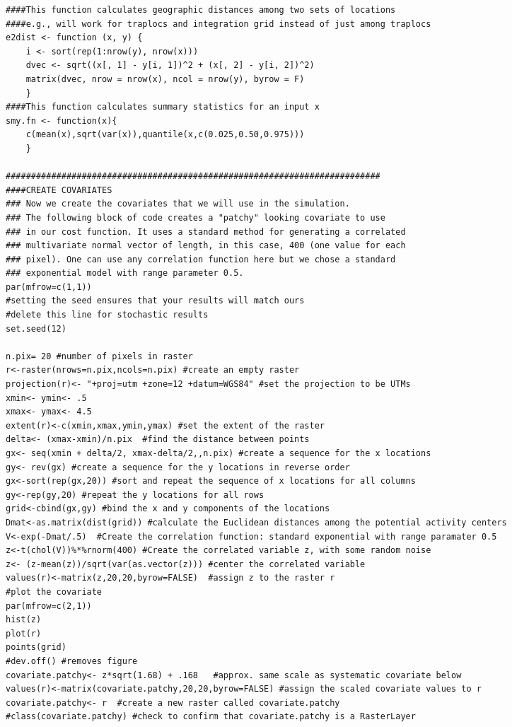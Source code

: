 \documentclass[12pt]{article}
\begin{document}
\begin{spacing}{1.2}
{\begin{verbatim}
####This function calculates geographic distances among two sets of locations 
####e.g., will work for traplocs and integration grid instead of just among traplocs 
e2dist <- function (x, y) {
    i <- sort(rep(1:nrow(y), nrow(x)))
    dvec <- sqrt((x[, 1] - y[i, 1])^2 + (x[, 2] - y[i, 2])^2)
    matrix(dvec, nrow = nrow(x), ncol = nrow(y), byrow = F)
    }
####This function calculates summary statistics for an input x
smy.fn <- function(x){
    c(mean(x),sqrt(var(x)),quantile(x,c(0.025,0.50,0.975)))
    }

##########################################################################
####CREATE COVARIATES
### Now we create the covariates that we will use in the simulation.
### The following block of code creates a "patchy" looking covariate to use
### in our cost function. It uses a standard method for generating a correlated
### multivariate normal vector of length, in this case, 400 (one value for each
### pixel). One can use any correlation function here but we chose a standard
### exponential model with range parameter 0.5.
par(mfrow=c(1,1))
#setting the seed ensures that your results will match ours 
#delete this line for stochastic results
set.seed(12)  

n.pix= 20 #number of pixels in raster
r<-raster(nrows=n.pix,ncols=n.pix) #create an empty raster
projection(r)<- "+proj=utm +zone=12 +datum=WGS84" #set the projection to be UTMs
xmin<- ymin<- .5
xmax<- ymax<- 4.5
extent(r)<-c(xmin,xmax,ymin,ymax) #set the extent of the raster
delta<- (xmax-xmin)/n.pix  #find the distance between points 
gx<- seq(xmin + delta/2, xmax-delta/2,,n.pix) #create a sequence for the x locations
gy<- rev(gx) #create a sequence for the y locations in reverse order
gx<-sort(rep(gx,20)) #sort and repeat the sequence of x locations for all columns
gy<-rep(gy,20) #repeat the y locations for all rows
grid<-cbind(gx,gy) #bind the x and y components of the locations
Dmat<-as.matrix(dist(grid)) #calculate the Euclidean distances among the potential activity centers 
V<-exp(-Dmat/.5)  #Create the correlation function: standard exponential with range paramater 0.5
z<-t(chol(V))%*%rnorm(400) #Create the correlated variable z, with some random noise
z<- (z-mean(z))/sqrt(var(as.vector(z))) #center the correlated variable
values(r)<-matrix(z,20,20,byrow=FALSE)  #assign z to the raster r
#plot the covariate
par(mfrow=c(2,1)) 
hist(z)
plot(r)
points(grid)
#dev.off() #removes figure
covariate.patchy<- z*sqrt(1.68) + .168   #approx. same scale as systematic covariate below
values(r)<-matrix(covariate.patchy,20,20,byrow=FALSE) #assign the scaled covariate values to r
covariate.patchy<- r  #create a new raster called covariate.patchy
#class(covariate.patchy) #check to confirm that covariate.patchy is a RasterLayer


\end{verbatim}}
\end{spacing}
\end{document}
